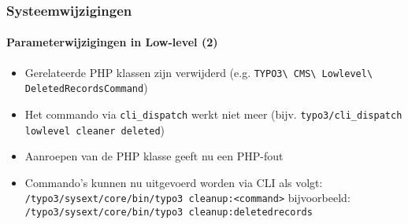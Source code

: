 \begin{frame}[fragile]
	\frametitle{Systeemwijzigingen}
	\framesubtitle{Parameterwijzigingen in Low-level (2)}


	\begin{itemize}
		\item Gerelateerde PHP klassen zijn verwijderd\newline
			\smaller(e.g. \texttt{TYPO3\textbackslash
				CMS\textbackslash
				Lowlevel\textbackslash
				DeletedRecordsCommand})
			\normalsize

		\item Het commando via \texttt{cli\_dispatch} werkt niet meer\newline
			\smaller(bijv. \texttt{typo3/cli\_dispatch lowlevel cleaner deleted})\normalsize
		\item Aanroepen van de PHP klasse geeft nu een PHP-fout

		\item Commando's kunnen nu uitgevoerd worden via CLI als volgt:\newline
			\smaller\texttt{/typo3/sysext/core/bin/typo3 cleanup:<command>}\normalsize\newline
			bijvoorbeeld:\newline
			\smaller\texttt{/typo3/sysext/core/bin/typo3 cleanup:deletedrecords}\normalsize

	\end{itemize}

\end{frame}


